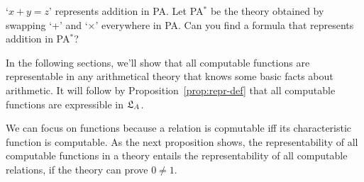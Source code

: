 

\begin{exercise}
  `$x+y = z$' represents addition in PA.
  Let PA$^\ast$ be the theory obtained by swapping
  `+' and `$\times$' everywhere in PA.
  Can you find a formula that represents addition in PA$^\ast$?
\end{exercise}

In the following sections,
we'll show that
all computable functions are representable in any
arithmetical theory that knows some basic facts about arithmetic.
It will follow by Proposition~\ref{prop:repr-def} that
all computable functions are expressible in $\mathfrak{L}_{A}$.

We can focus on functions
because a relation is copmutable iff its characteristic function is computable.
As the next proposition shows,
the representability of all computable functions in a theory
entails the representability of all computable relations,
if the theory can prove $0 \not= 1$.

